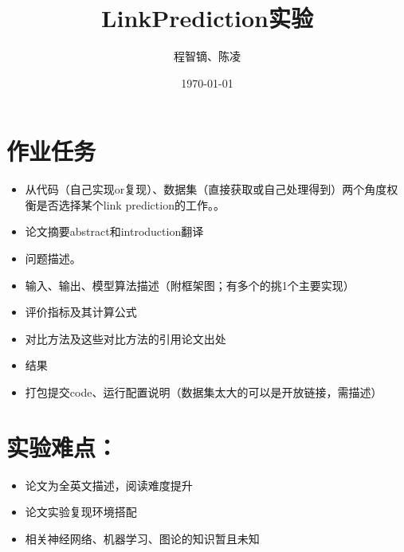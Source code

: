 \documentclass{article}
\title{LinkPrediction实验}
\author{程智镝、陈凌}
\date{\today}
\begin{document}
\maketitle

\section*{作业任务}
\begin{itemize}
    \item 从代码（自己实现or复现）、数据集（直接获取或自己处理得到）两个角度权衡是否选择某个link prediction的工作。。
    \item 论文摘要abstract和introduction翻译
    \item 问题描述。
    \item 输入、输出、模型算法描述（附框架图；有多个的挑1个主要实现）
    \item 评价指标及其计算公式
    \item 对比方法及这些对比方法的引用论文出处
    \item 结果
    \item 打包提交code、运行配置说明（数据集太大的可以是开放链接，需描述）
\end{itemize}
\section*{实验难点：}
\begin{itemize}
    \item 论文为全英文描述，阅读难度提升
    \item 论文实验复现环境搭配
    \item 相关神经网络、机器学习、图论的知识暂且未知
\end{itemize}
\end{document}
